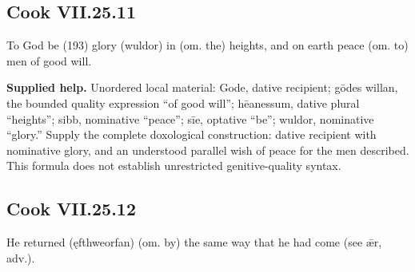 \par\begin{minipage}{\linewidth}\raggedright
\subsection*{Cook VII.25.11}

To God be (193) glory (wuldor) in (om. the) heights, and on earth peace (om. to) men of good will.

\end{minipage}\par\addvspace{4pt}

\textbf{Supplied help.} Unordered local material: Gode, dative recipient; gōdes willan, the bounded quality expression “of good will”; hēanessum, dative plural “heights”; sibb, nominative “peace”; sīe, optative “be”; wuldor, nominative “glory.” Supply the complete doxological construction: dative recipient with nominative glory, and an understood parallel wish of peace for the men described. This formula does not establish unrestricted genitive-quality syntax.

\par\begin{minipage}{\linewidth}\raggedright
\subsection*{Cook VII.25.12}

He returned (ęfthweorfan) (om. by) the same way that he had come (see ǣr, adv.).

\end{minipage}\par\addvspace{4pt}

